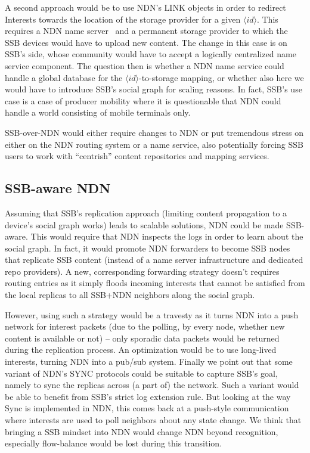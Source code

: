 \documentclass[sigconf]{acmart}
\begin{document}
A second approach would be to use NDN's LINK objects in order to redirect
Interests towards the location of the storage provider for a given
$\langle id\rangle$. This requires a NDN name server~\cite{NDNS} and a
permanent storage provider to which the SSB devices would
have to upload new content. The change in this case is on SSB's side,
whose community would have to accept a logically centralized name
service component. The question then is whether a NDN name service
could handle a global database for the $\langle id\rangle$-to-storage
mapping, or whether also here we would have to introduce SSB's social
graph for scaling reasons. In fact, SSB's use case is a case of
producer mobility where it is questionable that NDN could handle a
world consisting of mobile terminals only.

SSB-over-NDN would either require changes to NDN or put tremendous
stress on either on the NDN routing system or a name service, also
potentially forcing SSB users to work with ``centrish'' content
repositories and mapping services.

\subsection{SSB-aware NDN}

Assuming that SSB's replication approach (limiting content propagation
to a device's social graph works) leads to scalable solutions, NDN
could be made SSB-aware. This would require that NDN inspects the logs
in order to learn about the social graph. In fact, it would promote
NDN forwarders to become SSB nodes that replicate SSB content (instead
of a name server infrastructure and dedicated repo providers). A new,
corresponding forwarding strategy doesn't requires routing entries as
it simply floods incoming interests that cannot be satisfied from the
local replicas to all SSB+NDN neighbors along the social graph.

However, using such a strategy would be a travesty as it turns NDN
into a push network for interest packets (due to the polling, by every
node, whether new content is available or not) -- only sporadic data
packets would be returned during the replication process. An
optimization would be to use long-lived interests, turning NDN into a
pub/sub system. Finally we point out that some variant of NDN's SYNC
protocols could be suitable to capture SSB's goal, namely to sync the
replicas across (a part of) the network. Such a variant would be able
to benefit from SSB's strict log extension rule. But looking at the
way Sync is implemented in NDN, this comes back at a push-style
communication where interests are used to poll neighbors about any
state change. We think that bringing a SSB mindset into NDN would
change NDN beyond recognition, especially flow-balance would be
lost during this transition.
\end{document}
